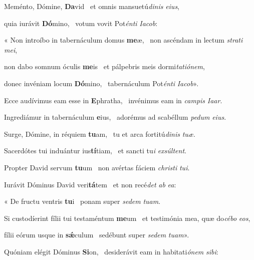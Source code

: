 \item Meménto, Dómine, \textbf{Da}vid~\psstar{} et omnis mansuetú\textit{dinis} \textit{eius},

\item quia iurávit \textbf{Dó}mino,~\psstar{} votum vovit Pot\textit{énti} \textit{Iacob}:

\item « Non introíbo in tabernáculum domus \textbf{me}æ,~\psstar{} non ascéndam in lectum \textit{strati} \textit{mei},

\item non dabo somnum óculis \textbf{me}is~\psstar{} et pálpebris meis dormi\textit{tatiónem},

\item donec invéniam locum \textbf{Dó}mino,~\psstar{} tabernáculum Pot\textit{énti} \textit{Iacob}».

\item Ecce audívimus eam esse in \textbf{E}phratha,~\psstar{} invénimus eam in \textit{campis} \textit{Iaar}.

\item Ingrediámur in tabernáculum \textbf{e}ius,~\psstar{} adorémus ad scabéllum \textit{pedum} \textit{eius}.

\item Surge, Dómine, in réquiem \textbf{tu}am,~\psstar{} tu et arca fortitú\textit{dinis} \textit{tuæ}.

\item Sacerdótes tui induántur ius\textbf{tí}tiam,~\psstar{} et sancti tu\textit{i} \textit{exsúltent}.

\item Propter David servum \textbf{tu}um~\psstar{} non avértas fáciem \textit{christi} \textit{tui}.

\item Iurávit Dóminus David veri\textbf{tá}tem~\psstar{} et non recé\textit{det} \textit{ab} \textit{ea}:

\item « De fructu ventris \textbf{tu}i~\psstar{} ponam super \textit{sedem} \textit{tuam}.

\item Si custodíerint fílii tui testaméntum \textbf{me}um~\psstar{} et testimónia mea, quæ do\textit{cébo} \textit{eos},

\item fílii eórum usque in \textbf{sǽ}culum~\psstar{} sedébunt super \textit{sedem} \textit{tuam}».

\item Quóniam elégit Dóminus \textbf{Si}on,~\psstar{} desiderávit eam in habitati\textit{ónem} \textit{sibi}:

